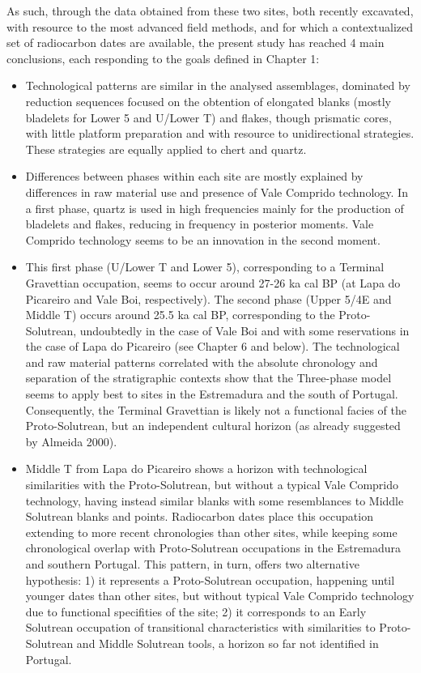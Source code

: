 \documentclass[12pt,twoside]{reedthesis}
\begin{document}
As such, through the data obtained from these two sites, both recently excavated, with resource to the most advanced field methods, and for which a contextualized set of radiocarbon dates are available, the present study has reached 4 main conclusions, each responding to the goals defined in Chapter 1:
\begin{itemize}
\item
  Technological patterns are similar in the analysed assemblages, dominated by reduction sequences focused on the obtention of elongated blanks (mostly bladelets for Lower 5 and U/Lower T) and flakes, though prismatic cores, with little platform preparation and with resource to unidirectional strategies. These strategies are equally applied to chert and quartz.
\item
  Differences between phases within each site are mostly explained by differences in raw material use and presence of Vale Comprido technology. In a first phase, quartz is used in high frequencies mainly for the production of bladelets and flakes, reducing in frequency in posterior moments. Vale Comprido technology seems to be an innovation in the second moment.
\item
  This first phase (U/Lower T and Lower 5), corresponding to a Terminal Gravettian occupation, seems to occur around 27-26 ka cal BP (at Lapa do Picareiro and Vale Boi, respectively). The second phase (Upper 5/4E and Middle T) occurs around 25.5 ka cal BP, corresponding to the Proto-Solutrean, undoubtedly in the case of Vale Boi and with some reservations in the case of Lapa do Picareiro (see Chapter 6 and below). The technological and raw material patterns correlated with the absolute chronology and separation of the stratigraphic contexts show that the Three-phase model seems to apply best to sites in the Estremadura and the south of Portugal. Consequently, the Terminal Gravettian is likely not a functional facies of the Proto-Solutrean, but an independent cultural horizon (as already suggested by Almeida 2000).
\item
  Middle T from Lapa do Picareiro shows a horizon with technological similarities with the Proto-Solutrean, but without a typical Vale Comprido technology, having instead similar blanks with some resemblances to Middle Solutrean blanks and points. Radiocarbon dates place this occupation extending to more recent chronologies than other sites, while keeping some chronological overlap with Proto-Solutrean occupations in the Estremadura and southern Portugal. This pattern, in turn, offers two alternative hypothesis: 1) it represents a Proto-Solutrean occupation, happening until younger dates than other sites, but without typical Vale Comprido technology due to functional specifities of the site; 2) it corresponds to an Early Solutrean occupation of transitional characteristics with similarities to Proto-Solutrean and Middle Solutrean tools, a horizon so far not identified in Portugal.
\end{itemize}
~
\end{document}
